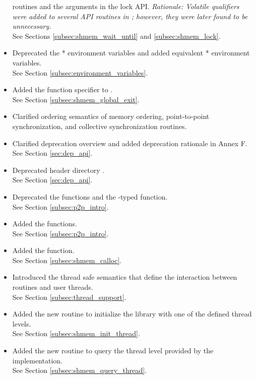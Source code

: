 \begin{itemize}
 routines and the  arguments in the lock API.
\emph{Rationale: Volatile qualifiers were added to several API routines in
\openshmem[1.3]; however, they were later found to be unnecessary.}
\\ See Sections \ref{subsec:shmem_wait_until} and \ref{subsec:shmem_lock}.
%
\item Deprecated the * environment variables and added equivalent
* environment variables.
\\ See Section \ref{subsec:environment_variables}.
%
\item Added the \Cstd[11]  function specifier to
.
\\ See Section \ref{subsec:shmem_global_exit}.
%
\item Clarified ordering semantics of memory ordering, point-to-point synchronization, and collective
synchronization routines.
%
\item Clarified deprecation overview and added deprecation rationale in Annex F.
\\See Section \ref{sec:dep_api}.
%
\item Deprecated header directory .
\\See Section \ref{sec:dep_api}.
%
\item Deprecated the  functions and the -typed \CorCpp {} function.
\\ See Section \ref{subsec:p2p_intro}.
%
\item Added the  functions.
\\ See Section \ref{subsec:p2p_intro}.
%
\item Added the  function.
\\ See Section \ref{subsec:shmem_calloc}.
%
\item Introduced the thread safe semantics that define the interaction between
    \openshmem routines and user threads.
\\See Section \ref{subsec:thread_support}.
%
\item Added the new routine  to initialize the
    \openshmem library with one of the defined thread levels.
\\See Section \ref{subsec:shmem_init_thread}.
%
\item Added the new routine  to query the thread
    level provided by the \openshmem implementation.
\\See Section \ref{subsec:shmem_query_thread}.

\end{itemize}
